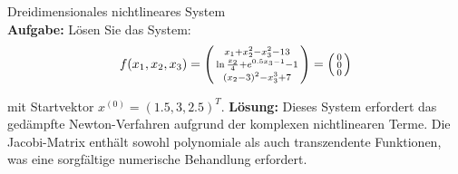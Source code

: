 \begin{example2}{Dreidimensionales nichtlineares System}\\
\textbf{Aufgabe:} Lösen Sie das System:
$$f(x_1, x_2, x_3) = \begin{psmallmatrix}
x_1 + x_2^2 - x_3^2 - 13 \\
\ln\frac{x_2}{4} + e^{0.5x_3-1} - 1 \\
(x_2 - 3)^2 - x_3^3 + 7
\end{psmallmatrix} = \begin{psmallmatrix} 0 \\ 0 \\ 0 \end{psmallmatrix}$$

mit Startvektor $x^{(0)} = (1.5, 3, 2.5)^T$.
\tcblower
\textbf{Lösung:}
Dieses System erfordert das gedämpfte Newton-Verfahren aufgrund der komplexen nichtlinearen Terme. Die Jacobi-Matrix enthält sowohl polynomiale als auch transzendente Funktionen, was eine sorgfältige numerische Behandlung erfordert.
\end{example2}



